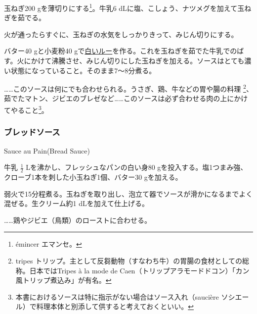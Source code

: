 \begin{recette}
玉ねぎ200 gを薄切りにする\footnote{émincer エマンセ。}。牛乳6
dLに塩、こしょう、ナツメグを加えて玉ねぎを茹でる。

火が通ったらすぐに、玉ねぎの水気をしっかりきって、みじん切りにする。

バター40 gと小麦粉40
gで\protect\hyperlink{roux-blanc}{白いルー}を作る。これを玉ねぎを茹でた牛乳でのばす。火にかけて沸騰させ、みじん切りにした玉ねぎを加える。ソースはとても濃い状態になっていること。そのまま7〜8分煮る。

\ldots{}\ldots{}このソースは何にでも合わせられる。うさぎ、鶏、牛などの胃や腸の料理
\footnote{tripes
  トリップ。主として反芻動物（すなわち牛）の胃腸の食材としての総称。日本ではTripes
  à la mode de
  Caen（トリップアラモードドコン）「カン風トリップ煮込み」が有名。}、茹でたマトン、ジビエのブレゼなど\ldots{}\ldots{}このソースは必ず合わせる肉の上にかけてやること\footnote{本書におけるソースは特に指示がない場合はソース入れ（saucière
  ソシエール）で料理本体と別添して供すると考えておくといい。}。

\atoaki{}

\hypertarget{bread-sauce}{%
\subsubsection{ブレッドソース}\label{bread-sauce}}

\begin{frsubenv}

Sauce au Pain\hspace{1em}\normalfont(Bread Sauce)

\end{frsubenv}


牛乳 \(\frac{1}{2}\) Lを沸かし、フレッシュなパンの白い身80
gを投入する。塩1つまみ強、クローブ1本を刺した小玉ねぎ1個、バター30
gを加える。

弱火で15分程煮る。玉ねぎを取り出し、泡立て器でソースが滑かになるまでよく混ぜる。生クリーム約1
dLを加えて仕上げる。

\ldots{}\ldots{}鶏やジビエ（鳥類）のローストに合わせる。


\end{recette}
